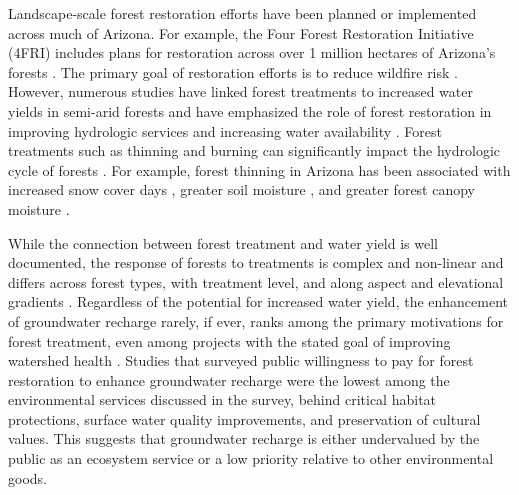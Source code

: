 \documentclass[
  number,
  preprint,
  3p,
  onecolumn]{elsarticle}
\begin{document}
Landscape-scale forest restoration efforts have been planned or
implemented across much of Arizona. For example, the Four Forest
Restoration Initiative (4FRI) includes plans for restoration across over
1 million hectares of Arizona's forests
\citep{schultz_collaborative_2012}. The primary goal of restoration
efforts is to reduce wildfire risk
\citep{allen_ecological_2002, friederici2013}. However, numerous studies
have linked forest treatments to increased water yields in semi-arid
forests and have emphasized the role of forest restoration in improving
hydrologic services and increasing water availability
\citep{bosch_review_1982, baker_effects_1986, gottfried_moderate_1991, smerdon_overview_2009, zou_streamflow_2010, wyatt_estimating_2013, moreno_modeling_2015, simonit_impact_2015, wyatt_semiarid_2015, odonnell_forest_2018, schenk_impacts_2020, hibbert1979}.
Forest treatments such as thinning and burning can significantly impact
the hydrologic cycle of forests \citep{del_campo_global_2022}. For
example, forest thinning in Arizona has been associated with increased
snow cover days
\citep{sankey_multi-scale_2015, belmonte_uav-based_2021, donager_integrating_2021},
greater soil moisture \citep{belmonte_soil_2022, sankey_thinning_2022},
and greater forest canopy moisture \citep{sankey_regionalscale_2021}.

While the connection between forest treatment and water yield is well
documented, the response of forests to treatments is complex and
non-linear and differs across forest types, with treatment level, and
along aspect and elevational gradients
\citep{del_campo_global_2022, biederman_streamflow_2022, zou_streamflow_2010, hibbert1979, moore_physical_2005}.
Regardless of the potential for increased water yield, the enhancement
of groundwater recharge rarely, if ever, ranks among the primary
motivations for forest treatment, even among projects with the stated
goal of improving watershed health
\citep{stanturf2014, filoso2017, allen_ecological_2002, friederici2013, odonnell2016}.
Studies that surveyed public willingness to pay for forest restoration
to enhance groundwater recharge were the lowest among the environmental
services discussed in the survey, behind critical habitat protections,
surface water quality improvements, and preservation of cultural
values\citep{mueller2019, soder2022}. This suggests that groundwater
recharge is either undervalued by the public as an ecosystem service or
a low priority relative to other environmental goods.
\end{document}
